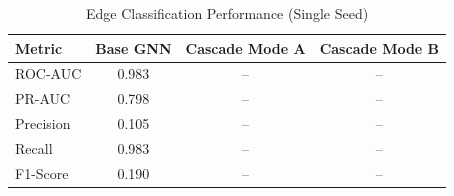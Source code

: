 \begin{table}[htbp]
\centering
\caption{Edge Classification Performance (Single Seed)}
\label{tab:single-seed-results}
\begin{tabular}{lccc}
\toprule
\textbf{Metric} & \textbf{Base GNN} & \textbf{Cascade Mode A} & \textbf{Cascade Mode B} \\
\midrule
ROC-AUC & 0.983 & -- & -- \\
PR-AUC & 0.798 & -- & -- \\
Precision & 0.105 & -- & -- \\
Recall & 0.983 & -- & -- \\
F1-Score & 0.190 & -- & -- \\
\bottomrule
    \end{tabular}
    \end{table}
    